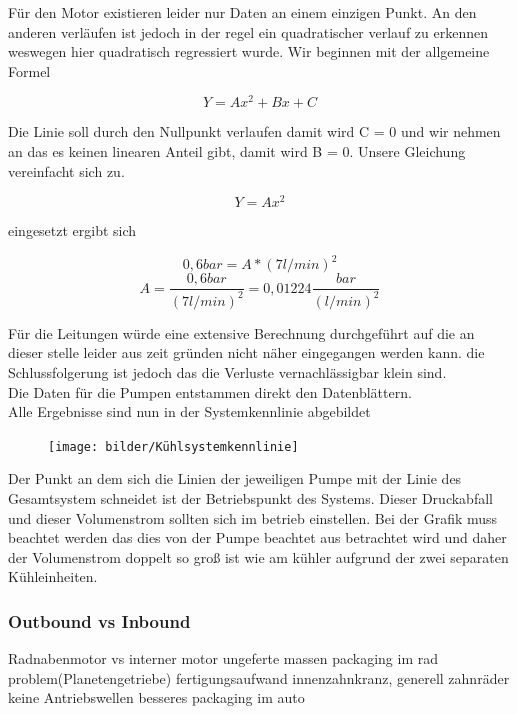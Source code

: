 Für den Motor existieren leider nur Daten an einem einzigen Punkt. An den anderen verläufen ist jedoch in der regel ein quadratischer verlauf zu erkennen weswegen hier quadratisch regressiert wurde. Wir beginnen mit der allgemeine Formel

\begin{equation}
	Y = A x^2 + B x + C
\end{equation}

Die Linie soll durch den Nullpunkt verlaufen damit wird C = 0 und wir nehmen an das es keinen linearen Anteil gibt, damit wird B = 0. Unsere Gleichung vereinfacht sich zu.

\begin{equation}
	Y = A x^2
\end{equation}

eingesetzt ergibt sich

\begin{equation}
	0,6 bar = A * (7 l/min)^2  
\end{equation}
\begin{equation}
	A = \dfrac{0,6 bar}{(7 l/min)^2 }
	  = 0,01224 \dfrac{bar}{(l/min)^2}
\end{equation}

Für die Leitungen würde eine extensive Berechnung durchgeführt auf die an dieser stelle leider aus zeit gründen nicht näher eingegangen werden kann. die Schlussfolgerung ist jedoch das die Verluste vernachlässigbar klein sind. \\

Die Daten für die Pumpen entstammen direkt den Datenblättern.\\

Alle Ergebnisse sind nun in der Systemkennlinie abgebildet

\begin{figure}[h]
	\centering
	\texttt{[image: bilder/Kühlsystemkennlinie]}
	\caption{}
	\label{fig:kuhlsystemkennlinie}
\end{figure}

Der Punkt an dem sich die Linien der jeweiligen Pumpe mit der Linie des Gesamtsystem schneidet ist der Betriebspunkt des Systems. Dieser Druckabfall und dieser Volumenstrom sollten sich im betrieb einstellen. Bei der Grafik muss beachtet werden das dies von der Pumpe beachtet aus betrachtet wird und daher der Volumenstrom doppelt so groß ist wie am kühler aufgrund der zwei separaten Kühleinheiten.


\subsubsection{Outbound vs Inbound}
Radnabenmotor vs interner motor 
ungeferte massen
packaging im rad problem(Planetengetriebe) fertigungsaufwand innenzahnkranz, generell zahnräder
keine Antriebswellen
besseres packaging im auto

